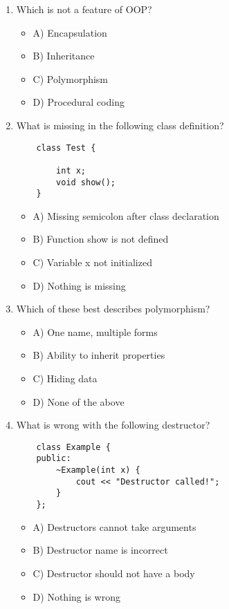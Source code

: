\documentclass[a4paper,12pt]{article}
\begin{document}
\begin{enumerate}

    \item Which is not a feature of OOP?
    \begin{itemize}
        \item A) Encapsulation
        \item B) Inheritance
        \item C) Polymorphism
        \item D) Procedural coding 
    \end{itemize}

    \item What is missing in the following class definition?

    \lstset{language=C}
    \begin{lstlisting}
    class Test {
    
        int x;
        void show();
    }
    \end{lstlisting}
    
    \begin{itemize}
        \item A) Missing semicolon after class declaration
        \item B) Function show is not defined
        \item C) Variable x not initialized
        \item D) Nothing is missing
    \end{itemize}

    \item Which of these best describes polymorphism?
    \begin{itemize}
        \item A) One name, multiple forms
        \item B) Ability to inherit properties
        \item C) Hiding data
        \item D) None of the above
    \end{itemize}

    \item What is wrong with the following destructor?

    \lstset{language=C}
    \begin{lstlisting}
    class Example {
    public:
        ~Example(int x) {
            cout << "Destructor called!";
        }
    };
    \end{lstlisting}
    
    \begin{itemize}
        \item A) Destructors cannot take arguments
        \item B) Destructor name is incorrect
        \item C) Destructor should not have a body
        \item D) Nothing is wrong
    \end{itemize}


\end{enumerate}
\end{document}
